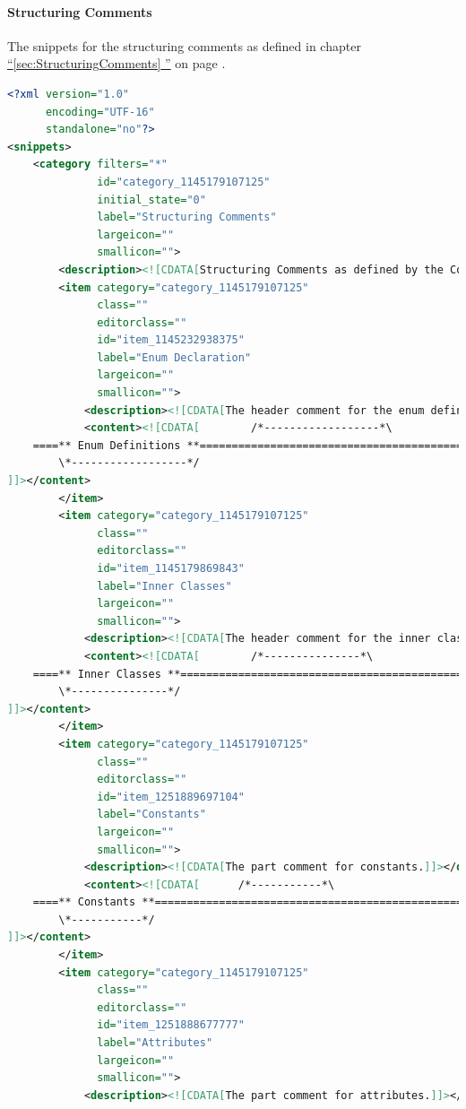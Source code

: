 \documentclass[12pt,a4paper,titlepage, parskip=half, headsepline, footsepline, cleardoubleplain]{scrbook}
\newcommand*{\tqfullvref}[1]{\hyperref[{#1}]{“\ref*{#1} \nameref*{#1}”} on page \pageref{#1}}
\begin{document}
\paragraph{Structuring Comments}\label{sec:SnippetStructuringComments}
The snippets for the structuring comments as defined in chapter \tqfullvref{sec:StructuringComments}.
\begin{lstlisting}[language=XML,basicstyle=\ttfamily\footnotesize]
<?xml version="1.0"
      encoding="UTF-16" 
      standalone="no"?>
<snippets>
    <category filters="*"
              id="category_1145179107125"
              initial_state="0"
              label="Structuring Comments"
              largeicon=""
              smallicon="">
        <description><![CDATA[Structuring Comments as defined by the Code Conventions]]></description>
        <item category="category_1145179107125"
              class=""
              editorclass=""
              id="item_1145232938375"
              label="Enum Declaration"
              largeicon=""
              smallicon="">
            <description><![CDATA[The header comment for the enum definition part]]></description>
            <content><![CDATA[        /*------------------*\
    ====** Enum Definitions **=================================================
        \*------------------*/
]]></content>
        </item>
        <item category="category_1145179107125"
              class=""
              editorclass=""
              id="item_1145179869843"
              label="Inner Classes"
              largeicon=""
              smallicon="">
            <description><![CDATA[The header comment for the inner classes part]]></description>
            <content><![CDATA[        /*---------------*\
    ====** Inner Classes **====================================================
        \*---------------*/
]]></content>
        </item>
        <item category="category_1145179107125"
              class=""
              editorclass=""
              id="item_1251889697104"
              label="Constants"
              largeicon=""
              smallicon="">
            <description><![CDATA[The part comment for constants.]]></description>
            <content><![CDATA[      /*-----------*\
    ====** Constants **========================================================
        \*-----------*/
]]></content>
        </item>
        <item category="category_1145179107125"
              class=""
              editorclass=""
              id="item_1251888677777"
              label="Attributes"
              largeicon=""
              smallicon="">
            <description><![CDATA[The part comment for attributes.]]></description>

\end{lstlisting}
\end{document}
